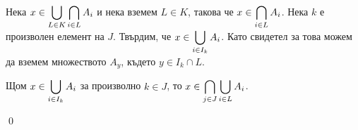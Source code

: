 \begin{problem}
\begin{tcolorbox}[mybox={Доказателство:}]
\quad
Нека $\displaystyle x \in \bigcup_{L \in K} \bigcap_{i \in L} A_i$ и нека вземем $L \in K$,
такова че $\displaystyle x \in \bigcap_{i \in L} A_i$.
Нека $k$ е произволен елемент на $J$.
Твърдим, че $\displaystyle x \in \bigcup_{i \in I_k} A_i$.
Като свидетел за това можем да вземем множеството $A_y$, където $y \in I_k \cap L$.

\quad
Щом $\displaystyle x \in \bigcup_{i \in I_k} A_i$ за произволно $k \in J$,
то $\displaystyle x \in \bigcap_{j \in J} \bigcup_{i \in L} A_i$.

\qed
\end{tcolorbox}

\end{problem}
